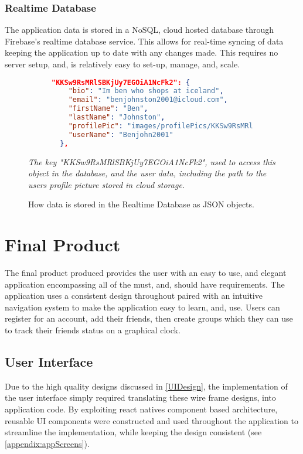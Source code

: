 \subsubsection{Realtime Database}
The application data is stored in a NoSQL, cloud hosted database through Firebase's realtime database service. This allows for real-time syncing of data keeping the application up to date with any changes made. This requires no server setup, and, is relatively easy to set-up, manage, and, scale.
\begin{figure}[!htbp]
\centering
\begin{subfigure}[b]{0.85\textwidth}
\begin{lstlisting}[language=json]
"KKSw9RsMRlSBKjUy7EGOiA1NcFk2": {
    "bio": "Im ben who shops at iceland",
    "email": "benjohnston2001@icloud.com",
    "firstName": "Ben",
    "lastName": "Johnston",
    "profilePic": "images/profilePics/KKSw9RsMRlSBKjUy7EGOiA1NcFk2",
    "userName": "Benjohn2001"
  },
\end{lstlisting}
\end{subfigure}
\caption{How data is stored in the Realtime Database as JSON objects.}
\small\par\textit{{The key "KKSw9RsMRlSBKjUy7EGOiA1NcFk2", used to access this object in the database, and the user data, including the path to the users profile picture stored in cloud storage.}}
\label{jsonResp}
\end{figure}

\section{Final Product}
The final product produced provides the user with an easy to use, and elegant application encompassing all of the must, and, should have requirements. The application uses a consistent design throughout paired with an intuitive navigation system to make the application easy to learn, and, use. Users can register for an account, add their friends, then create groups which they can use to track their friends status on a graphical clock.
\subsection{User Interface}
Due to the high quality designs discussed in \ref{UIDesign}, the implementation of the user interface simply required translating these wire frame designs, into application code.
By exploiting react natives component based architecture, reusable UI components were constructed and used throughout the application to streamline the implementation, while keeping the design consistent (see \ref{appendix:appScreens}).
